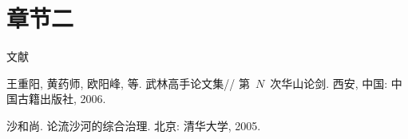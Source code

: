 

\section{章节二}

文献\cite{cnproceed,shaheshang}

\begin{thebibliography}{99}
王重阳, 黄药师, 欧阳峰, 等.
\newblock 武林高手论文集\allowbreak[C]//\allowbreak
第~$N$~次华山论剑.
\newblock 西安, 中国: 中国古籍出版社, 2006.

沙和尚.
\newblock 论流沙河的综合治理\allowbreak[Z].
\newblock 北京: 清华大学, 2005.
\end{thebibliography}

